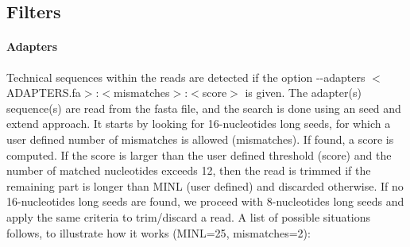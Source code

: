 \subsection*{Filters}

\paragraph*{Adapters}

Technical sequences within the reads are detected if the option {\ttfamily -\/-\/adapters $<$A\+D\+A\+P\+T\+E\+R\+S.\+fa$>$\+:$<$mismatches$>$\+:$<$score$>$} is given. The adapter(s) sequence(s) are read from the fasta file, and the search is done using an \textquotesingle{}seed and extend\textquotesingle{} approach. It starts by looking for 16-\/nucleotides long seeds, for which a user defined number of mismatches is allowed ({\ttfamily mismatches}). If found, a score is computed. If the score is larger than the user defined threshold ({\ttfamily score}) and the number of matched nucleotides exceeds 12, then the read is trimmed if the remaining part is longer than {\ttfamily M\+I\+NL} (user defined) and discarded otherwise. If no 16-\/nucleotides long seeds are found, we proceed with 8-\/nucleotides long seeds and apply the same criteria to trim/discard a read. A list of possible situations follows, to illustrate how it works ({\ttfamily M\+I\+NL=25}, {\ttfamily mismatches=2})\+:


